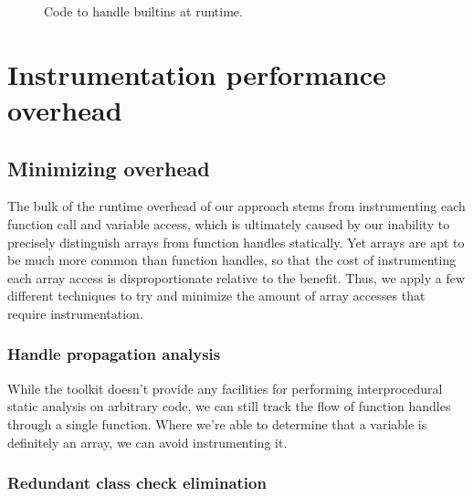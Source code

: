 \begin{figure}[htbp]
  
\caption{Code to handle builtins at runtime.}
\label{Fig:LogThenRunBuiltin}
\end{figure}


\section{Instrumentation performance overhead}


\subsection{Minimizing overhead}

The bulk of the runtime overhead of our approach stems from instrumenting each
function call and variable access, which is ultimately caused by our inability
to precisely distinguish arrays from function handles statically. Yet arrays
are apt to be much more common than function handles, so that the cost of
instrumenting each array access is disproportionate relative to the benefit.
Thus, we apply a few different techniques to try and minimize the amount of
array accesses that require instrumentation.

\subsubsection{Handle propagation analysis}

While the \mclab toolkit doesn't provide any facilities for performing
interprocedural static analysis on arbitrary \matlab code, we can still track
the flow of function handles through a single function. Where we're able to
determine that a variable is definitely an array, we can avoid instrumenting
it.


\subsubsection{Redundant class check elimination}

%

